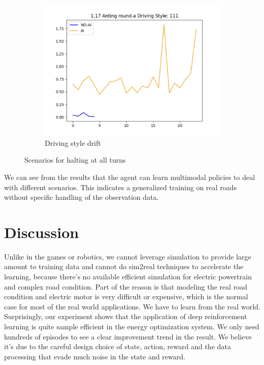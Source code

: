 \documentclass{article}
\begin{document}
\begin{figure}[htbp]
\begin{subfigure}[t]{0.3\textwidth}
		\centering
		\includegraphics[width=\textwidth]{images/openroad_mm_111_style.png}
		\caption{Driving style drift}\label{fig:openroad mm 111 style}
	\end{subfigure}
	\caption{Scenarios for halting at all turns\label{fig:open road mm 111}}
\end{figure}

We can see from the results that the agent can learn multimodal policies to deal with different scenarios. This indicates a generalized training on real roads without specific handling of the observation data.


\section{Discussion}
\label{sec:discussion}


Unlike in the games or robotics, we cannot leverage simulation to provide large amount to training data and cannot do sim2real techniques to accelerate the learning, because there's no available efficient simulation for electric powertrain and complex road condition. Part of the reason is that modeling the real road condition and electric motor is very difficult or expensive, which is the normal case for most of the real world applications. We have to learn from the real world. Surprisingly,  our experiment shows that the application of deep reinforcement learning is quite sample efficient in the energy optimization system. We only need hundreds of episodes to see a clear improvement trend in the result. We believe it's due to the careful design choice of state, action, reward and the data processing that evade much noise in the state and reward.
\end{document}
